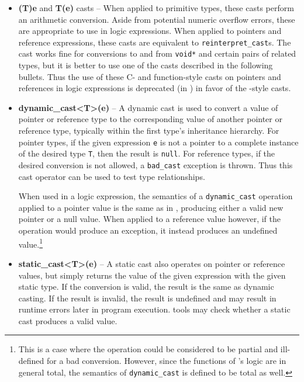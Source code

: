 \begin{itemize}
	\item \textbf{(T)e} and \textbf{T(e)} casts -- When applied to primitive types, these casts perform an arithmetic conversion. Aside from potential numeric overflow errors, these are appropriate to use in logic expressions. When applied to pointers and reference expressions, these casts are equivalent to
	\lstinline|reinterpret_cast|s. The cast works fine for conversions to and from \lstinline|void*| and certain pairs of related types, but it is better to use one of
	the \lang casts described in the following bullets.
	Thus the use of these C- and function-style casts on 
	pointers and references in logic expressions is 
	deprecated (in \NAME) in favor of the \lang-style casts.
	
	\item \textbf{dynamic\_cast<T>(e)} -- A dynamic cast is used to convert a value of pointer or reference type to the corresponding value of another pointer or reference type, typically within the first type's inheritance hierarchy. For pointer types, if the given expression \lstinline|e| is not a pointer to a complete instance of the desired type \lstinline|T|, then the result is \lstinline|null|. For reference types, if the desired conversion is not allowed, a \lstinline|bad_cast| exception is thrown. Thus this cast operator can be used to test type relationships.
	
	When used in a logic expression, the semantics of a \lstinline|dynamic_cast| operation applied to a pointer value is the same as in \lang, producing either a valid new pointer or a null value. When applied to a reference value however, if the operation would produce an exception, it instead produces an undefined value.\footnote{This is a case where the operation could be considered to be partial and ill-defined for a bad conversion. However, since the  functions of \NAME's logic are in general total, the semantics of \lstinline|dynamic_cast| is defined to be total as well.}  
	
	\item \textbf{static\_cast<T>(e)} -- A static cast also operates on pointer or reference values, but simply returns the value of the given expression with the given static type. If the conversion is valid, the result is the same as dynamic casting. If the result is invalid, the result is undefined and may result in runtime errors later in program execution. \NAME tools may check whether a static cast produces a valid value.
	

\end{itemize}
